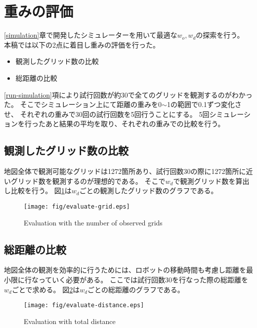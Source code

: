 \documentclass{jsarticle}
\begin{document}
\section{重みの評価}
\label{evaluate-weight}
\ref{simulation}章で開発したシミュレーターを用いて最適な$w_o,w_d$の探索を行う。
本稿では以下の2点に着目し重みの評価を行った。
\begin{itemize}
	\item 観測したグリッド数の比較
	\item 総距離の比較
\end{itemize}
\ref{run-simulation}項により試行回数が約30で全てのグリッドを観測するのがわかった。
そこでシミュレーション上にて距離の重みを0$\sim$1の範囲で0.1ずつ変化させ、
それぞれの重みで30回の試行回数を5回行うことにする。
5回シミュレーションを行ったあと結果の平均を取り、それぞれの重みでの比較を行う。


\subsection{観測したグリッド数の比較}
\label{evaluate-observation}
地図全体で観測可能なグリッドは1272箇所あり、試行回数30の際に1272箇所に近いグリッド数を観測するのが理想的である。
そこで$w_d$で観測グリッド数を算出し比較を行う。
図\ref{fig: evaluate-observation}は$w_d$ごとの観測したグリッド数のグラフである。


\begin{figure}[tbh]
 \centering
  \texttt{[image: fig/evaluate-grid.eps]}
  \vspace*{-4mm}
  \caption{Evaluation with the number of observed grids}
  \label{fig: evaluate-observation}
\end{figure}


\subsection{総距離の比較}
\label{evaluate-distance}
地図全体の観測を効率的に行うためには、ロボットの移動時間も考慮し距離を最小限に行なっていく必要がある。
ここでは試行回数30を行なった際の総距離を$w_d$ごとで求める。
図\ref{fig: evaluate-distance}は$w_d$ごとの総距離のグラフである。


\begin{figure}[tbh]
 \centering
  \texttt{[image: fig/evaluate-distance.eps]}
  \vspace*{-4mm}
  \caption{Evaluation with total distance}
  \label{fig: evaluate-distance}
\end{figure}
\end{document}
